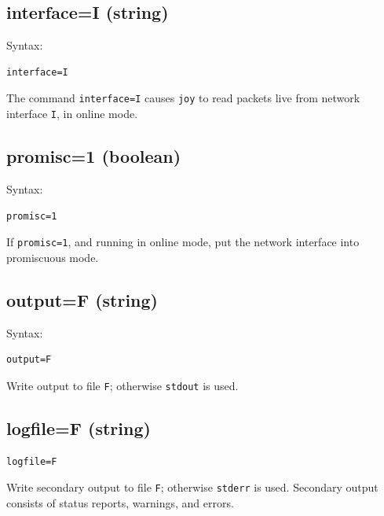 \documentclass{book}
\begin{document}
\subsection{interface=I (string)}
\label{interface}
\begin{mdframed}[style=aaa]
Syntax:
  \begin{verbatim}
interface=I               
  \end{verbatim}
\end{mdframed}
The command \texttt{interface=I} causes \texttt{joy} to read packets
live from network interface \texttt{I}, in online mode.  

\subsection{promisc=1 (boolean)}
\label{promisc}
\begin{mdframed}[style=aaa]
Syntax:
  \begin{verbatim}
promisc=1                 
  \end{verbatim}
\end{mdframed}
If \texttt{promisc=1}, and running in online mode, put the network
interface into promiscuous mode.

\subsection{output=F (string)}
\label{output}
\begin{mdframed}[style=aaa]
Syntax:
  \begin{verbatim}
output=F                   
  \end{verbatim}
\end{mdframed}
Write output to file \texttt{F}; otherwise \texttt{stdout} is used.

\subsection{logfile=F (string)}
\label{logfile}
\begin{mdframed}[style=aaa]
  \begin{verbatim}
logfile=F                  
  \end{verbatim}
\end{mdframed}
Write secondary output to file \texttt{F}; otherwise \texttt{stderr} is used.
Secondary output consists of status reports, warnings, and errors.
\end{document}
